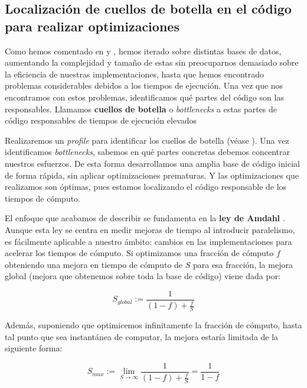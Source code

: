 \subsection{Localización de cuellos de botella en el código para realizar optimizaciones} \label{isubs:localizacion_partes_criticas}

Como hemos comentado en  y , hemos iterado sobre distintas bases de datos, aumentando la complejidad y tamaño de estas sin preocuparnos demasiado sobre la eficiencia de nuestras implementaciones, hasta que hemos encontrado problemas considerables debidos a los tiempos de ejecución. Una vez que nos encontramos con estos problemas, identificamos qué partes del código son las responsables. Llamamos \textbf{cuellos de botella} o \textit{bottlenecks} a estas partes de código responsables de tiempos de ejecución elevados

Realizaremos un \textit{profile} para identificar los cuellos de botella (véase ). Una vez identificamos \textit{bottlenecks}, sabemos en qué partes concretas debemos concentrar nuestros esfuerzos. De esta forma desarrollamos una amplia base de código inicial de forma rápida, sin aplicar optimizaciones prematuras. Y las optimizaciones que realizamos son óptimas, pues estamos localizando el código responsable de los tiempos de cómputo.

El enfoque que acabamos de describir se fundamenta en la \textbf{ley de Amdahl} \cite{informatica:amdahl_original} \cite{informatica:amdahl_moderno}. Aunque esta ley se centra en medir mejoras de tiempo al introducir paralelismo, es fácilmente aplicable a nuestro ámbito: cambios en las implementaciones para acelerar los tiempos de cómputo. Si optimizamos una fracción de cómputo $f$ obteniendo una mejora en tiempo de cómputo de $S$ para esa fracción, la mejora global (mejora que obtenemos sobre toda la base de código) viene dada por:

\begin{equation} \label{eq:amdahl}
    S_{global} := \frac{1}{(1 - f) + \frac{f}{S}}
\end{equation}

Además, suponiendo que optimicemos infinitamente la fracción de cómputo, hasta tal punto que sea instantánea de computar, la mejora estaría limitada de la siguiente forma:

\begin{equation}
    S_{max} := \lim_{S \to \infty}\frac{1}{(1 - f) + \frac{f}{S}} = \frac{1}{1 - f}
\end{equation}


